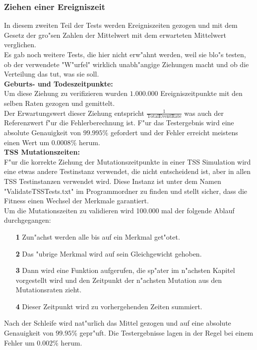 \documentclass[11pt, a4paper, german]{article}
\theoremstyle{plain}
\begin{document}
	\subsubsection{Ziehen einer Ereigniszeit}
	In diesem zweiten Teil der Tests werden Ereigniszeiten gezogen und mit dem Gesetz der gro"sen Zahlen der Mittelwert mit dem erwarteten Mittelwert verglichen.\\
	Es gab noch weitere Tests, die hier nicht erw"ahnt werden, weil sie blo"s testen, ob der verwendete "{}W"urfel"{} wirklich unabh"angige Ziehungen macht und ob die Verteilung das tut, was sie soll.\\
	
	\textbf{Geburts- und Todeszeitpunkte:}\\
	Um diese Ziehung zu verifizieren wurden $ 1.000.000 $ Ereigniszeitpunkte mit den selben Raten gezogen und gemittelt.\\
	Der Erwartungswert dieser Ziehung entspricht $ \frac{1}{\text{TotalEventRate}} $ was auch der Referenzwert f"ur die Fehlerberechnung ist. F"ur das Testergebnis wird eine absolute Genauigkeit von $ 99.995 \% $ gefordert und der Fehler erreicht meistens einen Wert um $ 0.0008\% $ herum.\\
	
	\textbf{TSS Mutationszeiten:}\\
	F"ur die korrekte Ziehung der Mutationszeitpunkte in einer TSS Simulation wird eine etwas andere Testinstanz verwendet, die nicht entscheidend ist, aber in allen TSS Testinstanzen verwendet wird. Diese Instanz ist unter dem Namen "{}ValidateTSSTests.txt"{} im Programmordner zu finden und stellt sicher, dass die Fitness einen Wechsel der Merkmale garantiert.\\
	Um die Mutationszeiten zu validieren wird 100.000 mal der folgende Ablauf durchgegangen:
	\begin{itemize}
		\item[\textbf{1}] Zun"achst werden alle bis auf ein Merkmal get"otet.
		\item[\textbf{2}] Das "ubrige Merkmal wird auf sein Gleichgewicht gehoben.
		\item[\textbf{3}] Dann wird eine Funktion aufgerufen, die sp"ater im n"achsten Kapitel vorgestellt wird und den Zeitpunkt der n"achsten Mutation aus den Mutationsraten zieht.
		\item[\textbf{4}] Dieser Zeitpunkt wird zu vorhergehenden Zeiten summiert.
	\end{itemize}
	Nach der Schleife wird nat"urlich das Mittel gezogen und auf eine absolute Genauigkeit von $ 99.95\% $ gepr"uft. Die Testergebnisse lagen in der Regel bei einem Fehler um $ 0.002\% $ herum.\\
	
\end{document}
